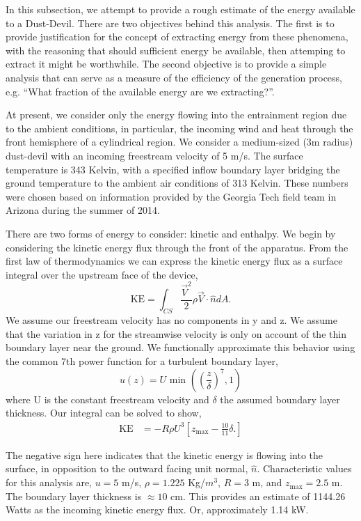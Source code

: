 In this subsection, we attempt to provide a rough estimate of the energy
available to a Dust-Devil. There are two objectives behind this
analysis. The first is to provide justification for the concept of
extracting energy from these phenomena, with the reasoning that should
sufficient energy be available, then attemping to extract it might be
worthwhile. The second objective is to provide a simple analysis that
can serve as a measure of the efficiency of the generation process,
e.g. ``What fraction of the available energy are we extracting?''.  

At present, we consider only the energy flowing into the entrainment
region due to the ambient conditions, in particular, the incoming wind
and heat through the front hemisphere of a cylindrical region. We
consider a medium-sized (3m radius) dust-devil with an incoming
freestream velocity of 5 m/s. The surface temperature is 343 Kelvin,
with a specified inflow boundary layer bridging the ground temperature
to the ambient air conditions of 313 Kelvin. 
These numbers were chosen
based on information provided by the Georgia Tech field team in Arizona
during the summer of 2014.  

There are two forms of energy to consider: kinetic and enthalpy. We
begin by considering the kinetic energy flux through the front of the
apparatus. From the first law of thermodynamics we can express the
kinetic energy flux as a surface integral over the upstream face of the device, 
\begin{equation*}
\text{KE} = \int_{CS} \frac{\vec V^2}{2} \rho \vec V \cdot \hat n dA.
\end{equation*}
%
%
We assume our freestream velocity has no components in y and z.
We assume that the variation in z for the streamwise velocity is only on
account of the thin boundary layer near the ground. We functionally
approximate this behavior using the common 7th power function for a
turbulent boundary layer,  
\begin{equation*}
  u(z) = U \text{ min }\left(\left(\frac{z}{\delta}\right)^7,1\right)
\end{equation*}
where U is the constant freestream velocity and $\delta$ the assumed
boundary layer thickness. Our integral can be solved to show, 
\begin{align*}
\text{KE} & = -R \rho U^3 \left[ z_{\text{max}} - \frac{10}{11}\delta.
\right]
\end{align*}


The negative sign here indicates that the kinetic energy is flowing into
the surface, in opposition to the outward facing unit normal, $\hat
n$. Characteristic values for this analysis are, $u = 5$ m/s, $\rho =
1.225$ Kg/$m^3$, $R = 3$ m, and $z_{\text{max}} = 2.5$ m. The boundary
layer thickness is $\approx 10$ cm. This provides
an estimate of 1144.26 Watts as the incoming kinetic energy flux. Or,
approximately 1.14 kW.  


%
%
